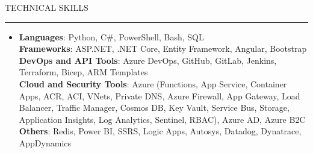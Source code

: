 \documentclass[letterpaper,10pt]{article}
\newcommand{\subheadingtitlevspace}{\vspace{-3pt}}
\newcommand{\titleItem}[1]{\textbf{#1}}
\newcommand{\ResumeSection}[1]{\par{\fontsize{11pt}{13pt}\selectfont \MakeUppercase{#1}}\vspace{1pt}\hrule height 0.6pt}
\newcommand{\SectionContentGap}{}
\begin{document}
\ResumeSection{Technical Skills}\vspace{-4pt}
\subheadingtitlevspace
\begin{itemize}[leftmargin=0.15in, label={}]
  \item{\titleItem{Languages}{: Python, C\#, PowerShell, Bash, SQL} \\
        \titleItem{Frameworks}{: ASP.NET, .NET Core, Entity Framework, Angular, Bootstrap} \\
        \titleItem{DevOps and API Tools}{: Azure DevOps, GitHub, GitLab, Jenkins, Terraform, Bicep, ARM Templates} \\
        \titleItem{Cloud and Security Tools}{: Azure (Functions, App Service, Container Apps, ACR, ACI, VNets, Private DNS, Azure Firewall, App Gateway, Load Balancer, Traffic Manager, Cosmos DB, Key Vault, Service Bus, Storage, Application Insights, Log Analytics, Sentinel, RBAC), Azure AD, Azure B2C} \\
        \titleItem{Others}{: Redis, Power BI, SSRS, Logic Apps, Autosys, Datadog, Dynatrace, AppDynamics}}
\end{itemize}
\SectionContentGap
\end{document}
